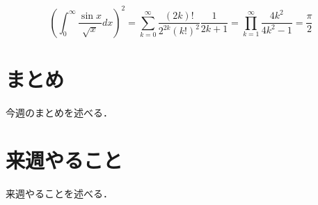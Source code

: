 \documentclass{classes/weekly_report}
\begin{document}
\begin{equation}
    \left( \int_{0}^\infty \frac{\sin x}{\sqrt {x}} dx \right)^{2}
    = \sum_{k = 0}^\infty \frac{(2k)!}{2^{2k}(k!)^{2}} \frac{1}{2k + 1}
    = \prod_{k = 1}^\infty \frac{4k^{2}}{4k^{2} - 1} = \frac{\pi}{2}
    \label{eq:label}
\end{equation}

\section{まとめ}
今週のまとめを述べる．

\section{来週やること}
来週やることを述べる．
\end{document}

